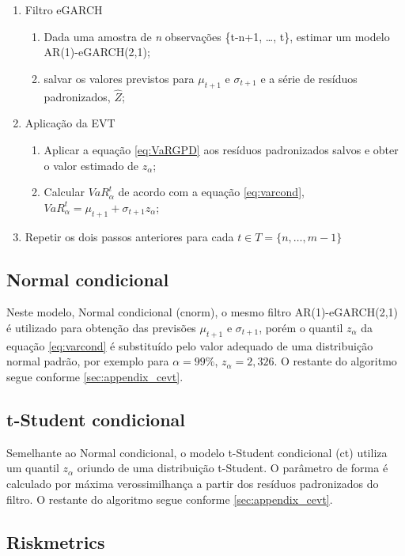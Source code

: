 \documentclass[1p]{elsarticle}
\theoremstyle{definition}
\begin{document}
\begin{enumerate}
	\item Filtro eGARCH
	\begin{enumerate}[label*=\arabic*.]
		\item Dada uma amostra de \emph{n} observações \{t-n+1, \ldots, t\}, estimar um modelo AR(1)-eGARCH(2,1);
		\item salvar os valores previstos para $\mu_{t+1}$ e $\sigma_{t+1}$ e a série de resíduos padronizados, $\hat{Z}$;
	\end{enumerate}

	\item Aplicação da EVT
	\begin{enumerate}[label*=\arabic*.]
		\item Aplicar a equação \eqref{eq:VaRGPD} aos resíduos padronizados salvos e obter o valor estimado de $z_\alpha$;
		\item Calcular $VaR^t_\alpha$ de acordo com a equação \eqref{eq:varcond}, $VaR_\alpha^t=\mu_{t+1}+\sigma_{t+1}z_\alpha$;
	\end{enumerate}
	\item Repetir os dois passos anteriores para cada $t \in T = \{n, \ldots, m-1\}$
\end{enumerate}

\subsection{Normal condicional}

Neste modelo, Normal condicional (cnorm), o mesmo filtro AR(1)-eGARCH(2,1) é utilizado para obtenção das previsões $\mu_{t+1}$ e $\sigma_{t+1}$, porém o quantil $z_\alpha$ da equação \ref{eq:varcond} é substituído pelo valor adequado de uma distribuição normal padrão, por exemplo para $\alpha = 99\%$, $z_\alpha = 2,326$. O restante do algoritmo segue conforme \ref{sec:appendix_cevt}.

\subsection{t-Student condicional}

Semelhante ao Normal condicional, o modelo t-Student condicional (ct) utiliza um quantil $z_\alpha$ oriundo de uma distribuição t-Student. O parâmetro de forma é calculado por máxima verossimilhança a partir dos resíduos padronizados do filtro. O restante do algoritmo segue conforme \ref{sec:appendix_cevt}.

\subsection{Riskmetrics}
\label{sec:appendix_riskmetrics}
\end{document}
